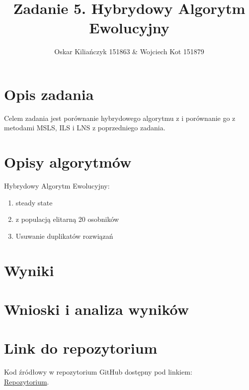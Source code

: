 \documentclass[11pt]{article}
\title{Zadanie 5. Hybrydowy Algorytm Ewolucyjny}
\author{Oskar Kiliańczyk 151863 \& Wojciech Kot 151879}
\date{}
\begin{document}
\maketitle
\newpage

\section{Opis zadania}\label{sec:opis-zadania}

Celem zadania jest porównanie hybrydowego algorytmu z  i porównanie go z metodami
MSLS, ILS i LNS z poprzedniego zadania.

\section{Opisy algorytmów}\label{sec:opisy-alg}

Hybrydowy Algorytm Ewolucyjny:
\begin{enumerate}
\item steady state
\item z populacją elitarną 20 osobników
\item Usuwanie duplikatów rozwiązań
\end{enumerate}

\section{Wyniki}\label{sec:wyniki}

\section{Wnioski i analiza wyników}\label{sec:wnioski}


\section{Link do repozytorium}\label{sec:link-do-repo}
Kod źródłowy w repozytorium GitHub dostępny pod linkiem: \\
\href{https://github.com/KotZPolibudy/PUT_IMO/tree/main/Lab5%20-%20Ewolucyjny}{Repozytorium}.
\end{document}
